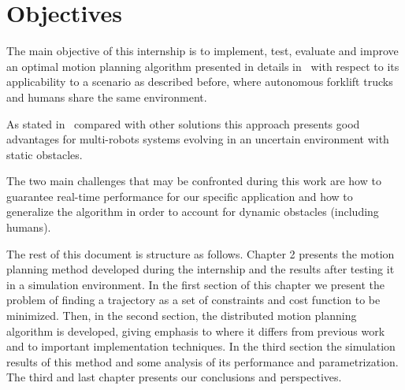 \section{Objectives}

The main objective of this internship is to implement, test, evaluate and improve an optimal motion planning algorithm presented in details in~\cite{Defoort2007a} with respect to its applicability to a scenario as described before, where autonomous forklift trucks and humans share the same environment.

As stated in~\cite{Defoort2007a} compared with other solutions
this approach presents good advantages for multi-robots systems evolving in an uncertain environment with static obstacles.

The two main challenges that may be confronted during this work are how to guarantee real-time performance for our specific application and how to generalize the algorithm in order to account for dynamic obstacles (including humans).

The rest of this document is structure as follows. Chapter 2 presents the motion planning method 
developed during the internship and the results after testing it in a simulation environment. In
the first section of this chapter we present the problem of finding a trajectory as a set of 
constraints and cost function to be minimized. Then, in the second section, the distributed 
motion planning algorithm is developed, giving emphasis to where it differs from previous 
work and to important implementation techniques. In the third section the
simulation results of this method and some analysis of its performance and parametrization.
The third and last chapter presents our conclusions and perspectives.


%
%
%
%

